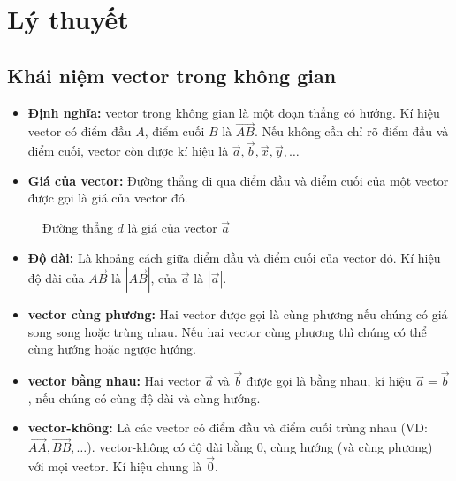 \documentclass[12pt]{article}
\begin{document}
	\section{Lý thuyết}
	
	\subsection{Khái niệm vector trong không gian}
	
	\begin{itemize}
		\item \textbf{Định nghĩa:} vector trong không gian là một đoạn thẳng có hướng. Kí hiệu vector có điểm đầu $A$, điểm cuối $B$ là $\overrightarrow{AB}$. Nếu không cần chỉ rõ điểm đầu và điểm cuối, vector còn được kí hiệu là $\vec{a}, \vec{b}, \vec{x}, \vec{y}, \dots$
		\item \textbf{Giá của vector:} Đường thẳng đi qua điểm đầu và điểm cuối của một vector được gọi là giá của vector đó.
	\end{itemize}
	
	\begin{figure}[H]
		\centering
		\caption{Đường thẳng $d$ là giá của vector $\vec{a}$}
	\end{figure}
	
	\begin{itemize}
		\item \textbf{Độ dài:} Là khoảng cách giữa điểm đầu và điểm cuối của vector đó. Kí hiệu độ dài của $\overrightarrow{AB}$ là $|\overrightarrow{AB}|$, của $\vec{a}$ là $|\vec{a}|$.
		\item \textbf{vector cùng phương:} Hai vector được gọi là cùng phương nếu chúng có giá song song hoặc trùng nhau. Nếu hai vector cùng phương thì chúng có thể cùng hướng hoặc ngược hướng.
		\item \textbf{vector bằng nhau:} Hai vector $\vec{a}$ và $\vec{b}$ được gọi là bằng nhau, kí hiệu $\vec{a} = \vec{b}$, nếu chúng có cùng độ dài và cùng hướng.
		\item \textbf{vector-không:} Là các vector có điểm đầu và điểm cuối trùng nhau (VD: $\overrightarrow{AA}, \overrightarrow{BB}, \dots$). vector-không có độ dài bằng $0$, cùng hướng (và cùng phương) với mọi vector. Kí hiệu chung là $\vec{0}$.
	\end{itemize}
	
\end{document}
